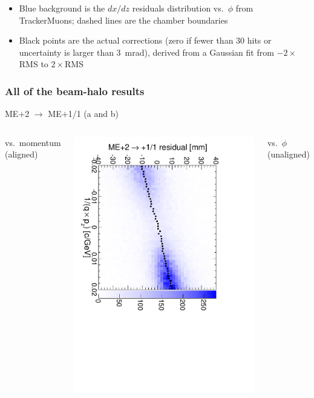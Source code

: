 \documentclass[compress]{beamer}
\begin{document}
\begin{frame}
\begin{itemize}
\item Blue background is the $dx/dz$ residuals distribution
  vs.\ $\phi$ from TrackerMuons; dashed lines are the chamber boundaries
\item Black points are the actual corrections (zero if fewer than 30
  hits or uncertainty is larger than 3~mrad), derived from a Gaussian
  fit from $-2\times$RMS to $2\times$RMS
\end{itemize}
\end{frame}

\begin{frame}
\frametitle{All of the beam-halo results}

\begin{center}
ME$+$2 $\to$ ME$+$1/1 (a and b)
\end{center}

\begin{columns}
\centering vs.\ momentum (aligned)

\includegraphics[height=\linewidth, angle=90]{linear_mep2to1inner.pdf}

\centering vs.\ $\phi$ (unaligned)


\end{columns}
\end{frame}
\end{document}
